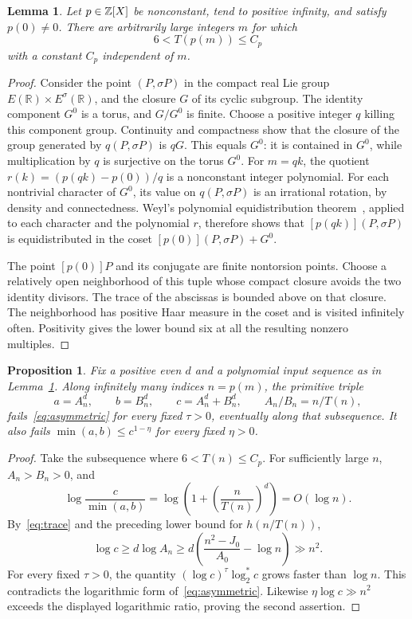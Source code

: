 \documentclass[11pt,a4paper]{article}
\newtheorem{proposition}[theorem]{Proposition}
\newtheorem{lemma}[theorem]{Lemma}
\begin{document}
\begin{lemma}\label{lem:boundedreal}
Let $p\in\mathbb Z[X]$ be nonconstant, tend to positive infinity, and satisfy
$p(0)\ne0$. There are arbitrarily large integers $m$ for which
\[
                    6<T(p(m))\le C_p
\]
with a constant $C_p$ independent of $m$.
\end{lemma}
\begin{proof}
Consider the point $(P,\sigma P)$ in the compact real Lie group
$E(\mathbb R)\times E^\sigma(\mathbb R)$, and the closure $G$ of its
cyclic subgroup. The identity component $G^0$ is a torus, and $G/G^0$
is finite. Choose a positive integer $q$ killing this component group.
Continuity and compactness show that the closure of the group generated
by $q(P,\sigma P)$ is $qG$. This equals $G^0$: it is contained in
$G^0$, while multiplication by $q$ is surjective on the torus $G^0$.
For $m=qk$, the quotient $r(k)=(p(qk)-p(0))/q$ is a nonconstant
integer polynomial.
For each nontrivial character of $G^0$, its value on
$q(P,\sigma P)$ is an irrational rotation, by density and connectedness.
Weyl's polynomial equidistribution theorem~\cite{Weyl}, applied to
each character and the polynomial $r$, therefore shows that
$[p(qk)](P,\sigma P)$ is equidistributed in the coset
$[p(0)](P,\sigma P)+G^0$.

The point $[p(0)]P$ and its conjugate are finite nontorsion points.
Choose a relatively open neighborhood of this tuple whose compact
closure avoids the two identity divisors. The trace of the abscissas
is bounded above on that closure. The neighborhood has positive Haar
measure in the coset and is visited infinitely often. Positivity gives
the lower bound six at all the resulting nonzero multiples.
\end{proof}

\begin{proposition}\label{prop:asymmetric}
Fix a positive even $d$ and a polynomial input sequence as in
Lemma~\ref{lem:boundedreal}. Along infinitely many indices $n=p(m)$,
the primitive triple
\[
             a=A_n^d,\qquad b=B_n^d,\qquad c=A_n^d+B_n^d,
             \qquad A_n/B_n=n/T(n),
\]
fails~\eqref{eq:asymmetric} for every fixed $\tau>0$, eventually
along that subsequence. It also fails
$\min(a,b)\le c^{1-\eta}$ for every fixed $\eta>0$.
\end{proposition}
\begin{proof}
Take the subsequence where $6<T(n)\le C_p$. For sufficiently large
$n$, $A_n>B_n>0$, and
\[
 \log\frac{c}{\min(a,b)}
 =\log\left(1+\left(\frac{n}{T(n)}\right)^d\right)=O(\log n).
\]
By~\eqref{eq:trace} and the preceding lower bound for $h(n/T(n))$,
\[
 \log c\ge d\log A_n
 \ge d\left(\frac{n^2-J_0}{A_0}-\log n\right)\gg n^2.
\]
For every fixed $\tau>0$, the quantity
$(\log c)^\tau\log_2^*c$ grows faster than $\log n$.
This contradicts the logarithmic form of~\eqref{eq:asymmetric}.
Likewise $\eta\log c\gg n^2$ exceeds the displayed logarithmic
ratio, proving the second assertion.
\end{proof}
\end{document}
